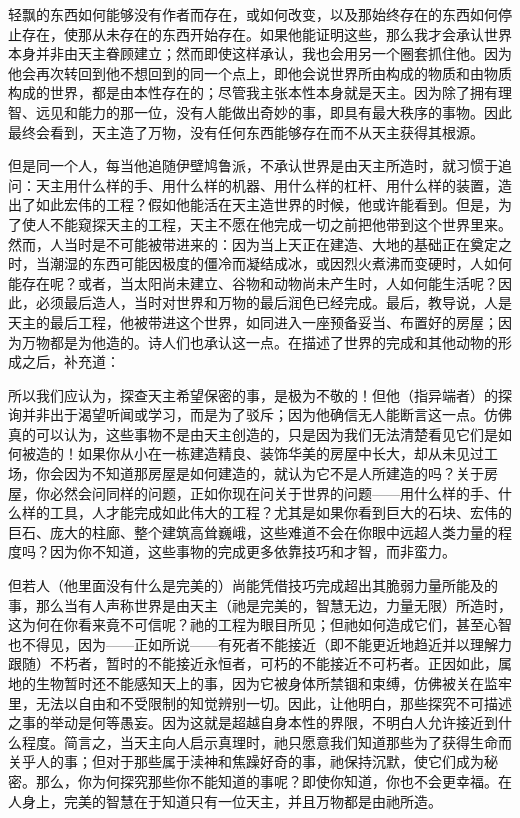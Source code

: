 轻飘的东西如何能够没有作者而存在，或如何改变，以及那始终存在的东西如何停止存在，使那从未存在的东西开始存在。如果他能证明这些，那么我才会承认世界本身并非由天主眷顾建立；然而即使这样承认，我也会用另一个圈套抓住他。因为他会再次转回到他不想回到的同一个点上，即他会说世界所由构成的物质和由物质构成的世界，都是由本性存在的；尽管我主张本性本身就是天主。因为除了拥有理智、远见和能力的那一位，没有人能做出奇妙的事，即具有最大秩序的事物。因此最终会看到，天主造了万物，没有任何东西能够存在而不从天主获得其根源。\par

但是同一个人，每当他追随伊壁鸠鲁派，不承认世界是由天主所造时，就习惯于追问：天主用什么样的手、用什么样的机器、用什么样的杠杆、用什么样的装置，造出了如此宏伟的工程？假如他能活在天主造世界的时候，他或许能看到。但是，为了使人不能窥探天主的工程，天主不愿在他完成一切之前把他带到这个世界里来。然而，人当时是不可能被带进来的：因为当上天正在建造、大地的基础正在奠定之时，当潮湿的东西可能因极度的僵冷而凝结成冰，或因烈火煮沸而变硬时，人如何能存在呢？或者，当太阳尚未建立、谷物和动物尚未产生时，人如何能生活呢？因此，必须最后造人，当时对世界和万物的最后润色已经完成。最后，教导说，人是天主的最后工程，他被带进这个世界，如同进入一座预备妥当、布置好的房屋；因为万物都是为他造的。诗人们也承认这一点。在描述了世界的完成和其他动物的形成之后，补充道：\par

\par

所以我们应认为，探查天主希望保密的事，是极为不敬的！但他（指异端者）的探询并非出于渴望听闻或学习，而是为了驳斥；因为他确信无人能断言这一点。仿佛真的可以认为，这些事物不是由天主创造的，只是因为我们无法清楚看见它们是如何被造的！如果你从小在一栋建造精良、装饰华美的房屋中长大，却从未见过工场，你会因为不知道那房屋是如何建造的，就认为它不是人所建造的吗？关于房屋，你必然会问同样的问题，正如你现在问关于世界的问题——用什么样的手、什么样的工具，人才能完成如此伟大的工程？尤其是如果你看到巨大的石块、宏伟的巨石、庞大的柱廊、整个建筑高耸巍峨，这些难道不会在你眼中远超人类力量的程度吗？因为你不知道，这些事物的完成更多依靠技巧和才智，而非蛮力。\par

但若人（他里面没有什么是完美的）尚能凭借技巧完成超出其脆弱力量所能及的事，那么当有人声称世界是由天主（祂是完美的，智慧无边，力量无限）所造时，这为何在你看来竟不可信呢？祂的工程为眼目所见；但祂如何造成它们，甚至心智也不得见，因为——正如所说——有死者不能接近（即不能更近地趋近并以理解力跟随）不朽者，暂时的不能接近永恒者，可朽的不能接近不可朽者。正因如此，属地的生物暂时还不能感知天上的事，因为它被身体所禁锢和束缚，仿佛被关在监牢里，无法以自由和不受限制的知觉辨别一切。因此，让他明白，那些探究不可描述之事的举动是何等愚妄。因为这就是超越自身本性的界限，不明白人允许接近到什么程度。简言之，当天主向人启示真理时，祂只愿意我们知道那些为了获得生命而关乎人的事；但对于那些属于渎神和焦躁好奇的事，祂保持沉默，使它们成为秘密。那么，你为何探究那些你不能知道的事呢？即使你知道，你也不会更幸福。在人身上，完美的智慧在于知道只有一位天主，并且万物都是由祂所造。\par

